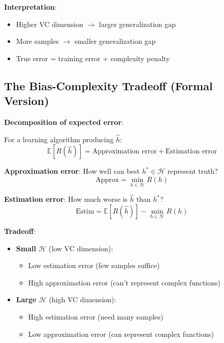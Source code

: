\documentclass[11pt,oneside]{book}
\begin{document}
\textbf{Interpretation}:
\begin{itemize}
    \item Higher VC dimension $\rightarrow$ larger generalization gap
    \item More samples $\rightarrow$ smaller generalization gap
    \item True error = training error + complexity penalty
\end{itemize}

\subsection{The Bias-Complexity Tradeoff (Formal Version)}

\textbf{Decomposition of expected error}:

For a learning algorithm producing $\hat{h}$:
\begin{equation}
\mathbb{E}[R(\hat{h})] = \text{Approximation error} + \text{Estimation error}
\end{equation}

\textbf{Approximation error}: How well can best $h^* \in \mathcal{H}$ represent truth?
\begin{equation}
\text{Approx} = \min_{h\in\mathcal{H}} R(h)
\end{equation}

\textbf{Estimation error}: How much worse is $\hat{h}$ than $h^*$?
\begin{equation}
\text{Estim} = \mathbb{E}[R(\hat{h})] - \min_{h\in\mathcal{H}} R(h)
\end{equation}

\textbf{Tradeoff}:
\begin{itemize}
    \item \textbf{Small $\mathcal{H}$} (low VC dimension):
    \begin{itemize}
        \item Low estimation error (few samples suffice)
        \item High approximation error (can't represent complex functions)
    \end{itemize}

    \item \textbf{Large $\mathcal{H}$} (high VC dimension):
    \begin{itemize}
        \item High estimation error (need many samples)
        \item Low approximation error (can represent complex functions)
    \end{itemize}
\end{itemize}
\end{document}
